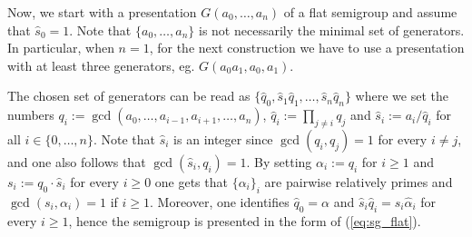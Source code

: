 \documentclass[oneside]{amsart}
\numberwithin{equation}{section}
\numberwithin{equation}{subsection}
\theoremstyle{plain}
\theoremstyle{definition}
\newcommand{\al}{\alpha}
\newcommand{\q}{q}
\begin{document}
Now, we start with a presentation $G(a_0,\dots,a_n)$ of a flat semigroup and  assume that $\widehat{s}_0=1$. Note that $\{a_0,\dots,a_n\}$ is not necessarily the minimal set of generators. In particular, when $n=1$, for the next construction we have to use a presentation with at least three generators, eg. $G(a_0a_1,a_0,a_1)$.

The chosen set of generators can be read as 
$\{\widehat{q}_0,\widehat{s}_1\widehat{q}_1,\dots, \widehat{s}_n\widehat{q}_n\}$ 
where we set the numbers $\q_i:=\gcd(a_0,\dots,a_{i-1},a_{i+1},\dots, a_n)$, $\widehat{\q}_i:=\prod_{j\neq i} \q_j$ and $\widehat{s}_i:=a_i/\widehat{\q}_i$ for all $i\in\{0,\dots,n\}$. Note that $\widehat{s}_i$ is an integer since $\gcd(\q_i,\q_j)=1$ for every $ i\neq j$, and one also follows that $\gcd(\widehat{s}_i,\q_i)=1$.  By setting $\al_i:=q_i$ for $i\geq 1$ and $s_i:=q_0\cdot \widehat{s}_i$ for every $i\geq 0$ one gets that $\{\al_i\}_i$ are pairwise relatively primes and $\gcd(s_i,\al_i)=1$ if $i\geq 1$. Moreover, one identifies $\widehat{q}_0=\alpha$ and $\widehat{s}_i\widehat{q}_i=s_i\widehat{\al}_i$ for every $i\geq 1$, hence the semigroup is presented  in the form of (\ref{eq:sg_flat}).  
\end{document}
